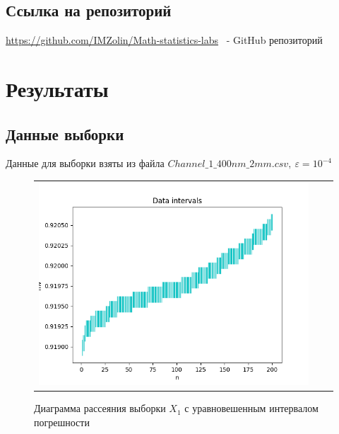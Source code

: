 \documentclass[a4paper,14pt]{article}
\begin{document}
		\subsection{Ссылка на репозиторий}
		\url{https://github.com/IMZolin/Math-statistics-labs} \ - GitHub репозиторий
	
	\section{Результаты}
	\subsection{Данные выборки}
	Данные для выборки взяты из файла $Channel\_ 1\_400nm\_2mm.csv, \ \varepsilon = 10^{-4}$
	
		\begin{figure}[H]
			\begin{center}
			\begin{tabular}{ccc}
				\includegraphics[scale=0.8]{../image/data_and_intervals1.png}
			\end{tabular}
		\end{center}
			\caption{ Диаграмма рассеяния выборки $X_1$ с уравновешенным интервалом погрешности} 
		\end{figure}
\end{document}
